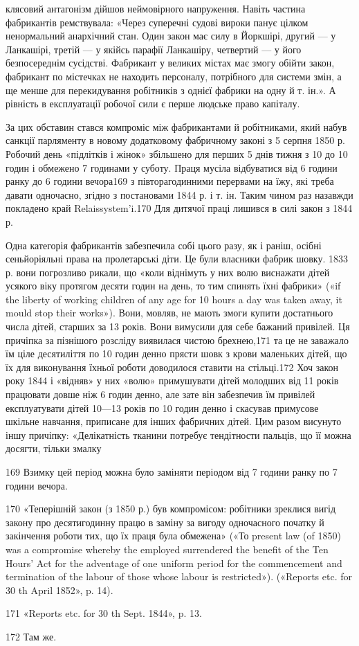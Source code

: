 клясовий антагонізм дійшов неймовірного напруження. Навіть
частина фабрикантів ремствувала: «Через суперечні судові
вироки панує цілком ненормальний анархічний стан. Один закон
має силу в Йоркшірі, другий — у Ланкашірі, третій — у якійсь
парафії Ланкашіру, четвертий — у його безпосереднім сусідстві.
Фабрикант у великих містах має змогу обійти закон, фабрикант
по містечках не находить персоналу, потрібного для системи змін,
а ще менше для перекидування робітників з однієї фабрики на
одну й т. ін.». А рівність в експлуатації робочої сили є перше
людське право капіталу.

За цих обставин стався компроміс між фабрикантами й робітниками,
який набув санкції парляменту в новому додатковому
фабричному законі з 5 серпня 1850 р. Робочий день «підлітків
і жінок» збільшено для перших 5 днів тижня з 10 до 10 годин
і обмежено 7 годинами у суботу. Праця мусіла відбуватися від
6 години ранку до 6 години вечора169 з півторагодинними перервами
на їжу, які треба давати одночасно, згідно з постановами
1844 р. і т. ін. Таким чином раз назавжди покладено край
Relaissystem’i.170 Для дитячої праці лишився в силі закон з
1844 р.

Одна категорія фабрикантів забезпечила собі цього разу,
як і раніш, осібні сеньйоріяльні права на пролетарські діти. Це
були власники фабрик шовку. 1833 р. вони погрозливо рикали,
що «коли віднімуть у них волю виснажати дітей усякого віку
протягом десяти годин на день, то тим спинять їхні фабрики»
(«if the liberty of working children of any age for 10 hours a day
was taken away, it mould stop their works»). Вони, мовляв, не
мають змоги купити достатнього числа дітей, старших за 13 років.
Вони вимусили для себе бажаний привілей. Ця причіпка за пізнішого
розсліду виявилася чистою брехнею,171 та це не заважало
їм ціле десятиліття по 10 годин денно прясти шовк з крови
маленьких дітей, що їх для виконування їхньої роботи доводилося
ставити на стільці.172 Хоч закон року 1844 і «відняв» у них
«волю» примушувати дітей молодших від 11 років працювати
довше ніж 6 годин денно, але зате він забезпечив їм привілей
експлуатувати дітей 10—13 років по 10 годин денно і скасував
примусове шкільне навчання, приписане для інших фабричних
дітей. Цим разом висунуто іншу причіпку: «Делікатність тканини
потребує тендітности пальців, що її можна досягти, тільки змалку

169 Взимку цей період можна було заміняти періодом від 7 години
ранку по 7 години вечора.

170 «Теперішній закон (з 1850 р.) був компромісом: робітники зреклися
вигід закону про десятигодинну працю в заміну за вигоду одночасного
початку й закінчення роботи тих, що їх праця була обмежена» («То
present law (of 1850) was a compromise whereby the employed surrendered
the benefit of the Ten Hours’ Act for the adventage of one uniform period
for the commencement and termination of the labour of those whose labour
is restricted»). («Reports etc. for 30 th April 1852», p. 14).

171 «Reports etc. for 30 th Sept. 1844», p. 13.

172    Там же.
